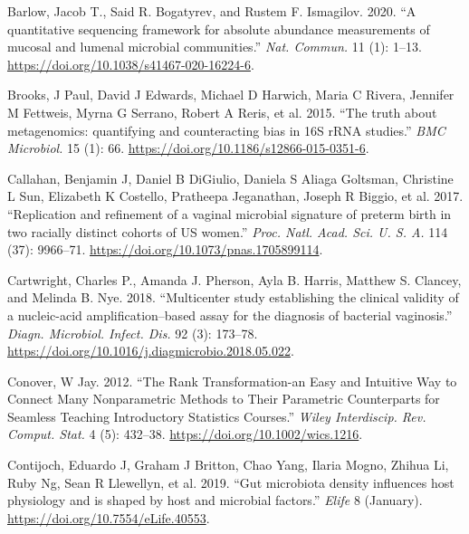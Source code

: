 \documentclass[
]{article}
\newlength{\cslhangindent}
\newlength{\cslentryspacingunit} %
\newenvironment{CSLReferences}[2] %
 {%
  \setlength{\parindent}{0pt}
  \ifodd #1
  \let\oldpar\par
  \def\par{\hangindent=\cslhangindent\oldpar}
  \fi
  \setlength{\parskip}{#2\cslentryspacingunit}
 }%
 {}
\begin{document}
\hypertarget{refs}{}
\begin{CSLReferences}{1}{0}
\leavevmode{}%
Barlow, Jacob T., Said R. Bogatyrev, and Rustem F. Ismagilov. 2020. {``{A quantitative sequencing framework for absolute abundance measurements of mucosal and lumenal microbial communities}.''} \emph{Nat. Commun.} 11 (1): 1--13. \url{https://doi.org/10.1038/s41467-020-16224-6}.

\leavevmode{}%
Brooks, J Paul, David J Edwards, Michael D Harwich, Maria C Rivera, Jennifer M Fettweis, Myrna G Serrano, Robert A Reris, et al. 2015. {``{The truth about metagenomics: quantifying and counteracting bias in 16S rRNA studies}.''} \emph{BMC Microbiol.} 15 (1): 66. \url{https://doi.org/10.1186/s12866-015-0351-6}.

\leavevmode{}%
Callahan, Benjamin J, Daniel B DiGiulio, Daniela S Aliaga Goltsman, Christine L Sun, Elizabeth K Costello, Pratheepa Jeganathan, Joseph R Biggio, et al. 2017. {``{Replication and refinement of a vaginal microbial signature of preterm birth in two racially distinct cohorts of US women}.''} \emph{Proc. Natl. Acad. Sci. U. S. A.} 114 (37): 9966--71. \url{https://doi.org/10.1073/pnas.1705899114}.

\leavevmode{}%
Cartwright, Charles P., Amanda J. Pherson, Ayla B. Harris, Matthew S. Clancey, and Melinda B. Nye. 2018. {``{Multicenter study establishing the clinical validity of a nucleic-acid amplification--based assay for the diagnosis of bacterial vaginosis}.''} \emph{Diagn. Microbiol. Infect. Dis.} 92 (3): 173--78. \url{https://doi.org/10.1016/j.diagmicrobio.2018.05.022}.

\leavevmode{}%
Conover, W Jay. 2012. {``The Rank Transformation-an Easy and Intuitive Way to Connect Many Nonparametric Methods to Their Parametric Counterparts for Seamless Teaching Introductory Statistics Courses.''} \emph{Wiley Interdiscip. Rev. Comput. Stat.} 4 (5): 432--38. \url{https://doi.org/10.1002/wics.1216}.

\leavevmode{}%
Contijoch, Eduardo J, Graham J Britton, Chao Yang, Ilaria Mogno, Zhihua Li, Ruby Ng, Sean R Llewellyn, et al. 2019. {``{Gut microbiota density influences host physiology and is shaped by host and microbial factors}.''} \emph{Elife} 8 (January). \url{https://doi.org/10.7554/eLife.40553}.


\end{CSLReferences}
\end{document}
